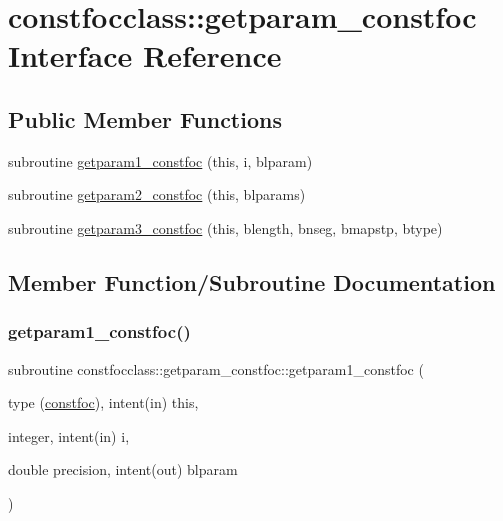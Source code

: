 \hypertarget{interfaceconstfocclass_1_1getparam__constfoc}{}\section{constfocclass\+::getparam\+\_\+constfoc Interface Reference}
\label{interfaceconstfocclass_1_1getparam__constfoc}
\subsection*{Public Member Functions}
\begin{DoxyCompactItemize}
\item 
subroutine \mbox{\hyperlink{interfaceconstfocclass_1_1getparam__constfoc_a245a46e19962cc75b009c9fd192968e8}{getparam1\+\_\+constfoc}} (this, i, blparam)
\item 
subroutine \mbox{\hyperlink{interfaceconstfocclass_1_1getparam__constfoc_a1f8bdcbf64852f3e12b02f785b70c511}{getparam2\+\_\+constfoc}} (this, blparams)
\item 
subroutine \mbox{\hyperlink{interfaceconstfocclass_1_1getparam__constfoc_a1f661b72d89f0d705b8267d7a16315fb}{getparam3\+\_\+constfoc}} (this, blength, bnseg, bmapstp, btype)
\end{DoxyCompactItemize}


\subsection{Member Function/\+Subroutine Documentation}
\mbox{\label{interfaceconstfocclass_1_1getparam__constfoc_a245a46e19962cc75b009c9fd192968e8}} 
\subsubsection{\texorpdfstring{getparam1\_constfoc()}{getparam1\_constfoc()}}
{\footnotesize\ttfamily subroutine constfocclass\+::getparam\+\_\+constfoc\+::getparam1\+\_\+constfoc (\begin{DoxyParamCaption}\item[{type (\mbox{\hyperlink{namespaceconstfocclass_structconstfocclass_1_1constfoc}{constfoc}}), intent(in)}]{this,  }\item[{integer, intent(in)}]{i,  }\item[{double precision, intent(out)}]{blparam }\end{DoxyParamCaption})}

